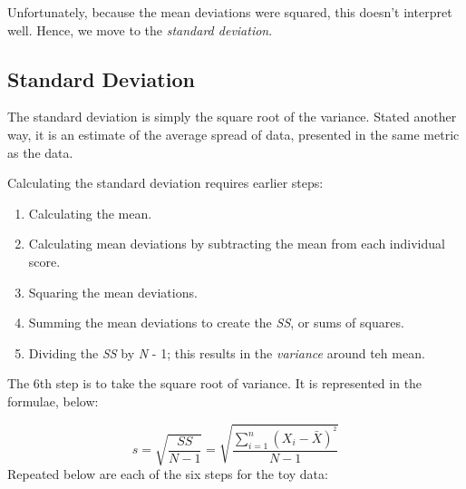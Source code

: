 \documentclass[
  11pt,
]{book}
\newenvironment{Shaded}{\begin{snugshade}}{\end{snugshade}}
\newcommand{\AttributeTok}[1]{\textcolor[rgb]{0.77,0.63,0.00}{#1}}
\newcommand{\CommentTok}[1]{\textcolor[rgb]{0.56,0.35,0.01}{\textit{#1}}}
\newcommand{\ConstantTok}[1]{\textcolor[rgb]{0.00,0.00,0.00}{#1}}
\newcommand{\DecValTok}[1]{\textcolor[rgb]{0.00,0.00,0.81}{#1}}
\newcommand{\FunctionTok}[1]{\textcolor[rgb]{0.00,0.00,0.00}{#1}}
\newcommand{\NormalTok}[1]{#1}
\newcommand{\OtherTok}[1]{\textcolor[rgb]{0.56,0.35,0.01}{#1}}
\newcommand{\SpecialCharTok}[1]{\textcolor[rgb]{0.00,0.00,0.00}{#1}}
\providecommand{\tightlist}{%
  \setlength{\itemsep}{0pt}\setlength{\parskip}{0pt}}
\begin{document}
Unfortunately, because the mean deviations were squared, this doesn't interpret well. Hence, we move to the \emph{standard deviation}.

\hypertarget{standard-deviation}{%
\subsection{Standard Deviation}\label{standard-deviation}}

The standard deviation is simply the square root of the variance. Stated another way, it is an estimate of the average spread of data, presented in the same metric as the data.

Calculating the standard deviation requires earlier steps:

\begin{enumerate}
\def\labelenumi{\arabic{enumi}.}
\tightlist
\item
  Calculating the mean.
\item
  Calculating mean deviations by subtracting the mean from each individual score.
\item
  Squaring the mean deviations.
\item
  Summing the mean deviations to create the \emph{SS}, or sums of squares.
\item
  Dividing the \emph{SS} by \emph{N} - 1; this results in the \emph{variance} around teh mean.
\end{enumerate}

The 6th step is to take the square root of variance. It is represented in the formulae, below:

\[s=\sqrt{\frac{SS}{N-1}}=\sqrt{\frac{\sum_{i=1}^{n}(X_{i} - \bar{X})^{^{2}}}{N-1}}\]
Repeated below are each of the six steps for the toy data:

\begin{Shaded}
\end{Shaded}
\end{document}
